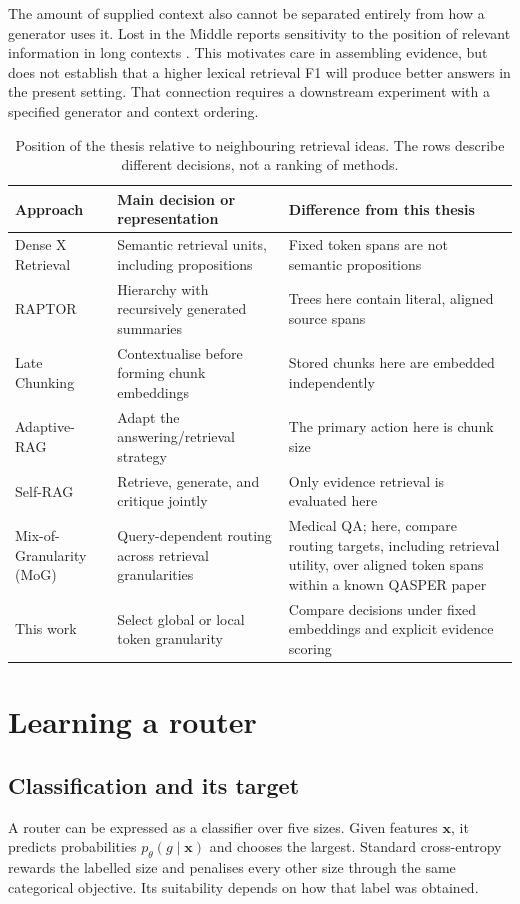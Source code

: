 The amount of supplied context also cannot be separated entirely from
how a generator uses it. Lost in the Middle reports sensitivity to the
position of relevant information in long contexts
\cite{liu2023lost}. This motivates care in assembling evidence, but
does not establish that a higher lexical retrieval F1 will produce
better answers in the present setting. That connection requires a
downstream experiment with a specified generator and context ordering.

\begin{table}[tbp]
\centering\small
\caption{Position of the thesis relative to neighbouring retrieval ideas.
The rows describe different decisions, not a ranking of methods.}
\label{tab:literature}
\begin{tabularx}{\textwidth}{@{}p{3.1cm}XX@{}}
\toprule
Approach & Main decision or representation & Difference from this thesis\\
\midrule
Dense X Retrieval & Semantic retrieval units, including propositions & Fixed token spans are not semantic propositions\\
RAPTOR & Hierarchy with recursively generated summaries & Trees here contain literal, aligned source spans\\
Late Chunking & Contextualise before forming chunk embeddings & Stored chunks here are embedded independently\\
Adaptive-RAG & Adapt the answering/retrieval strategy & The primary action here is chunk size\\
Self-RAG & Retrieve, generate, and critique jointly & Only evidence retrieval is evaluated here\\
Mix-of-Granularity (MoG) & Query-dependent routing across retrieval granularities & Medical QA; here, compare routing targets, including retrieval utility, over aligned token spans within a known QASPER paper\\
This work & Select global or local token granularity & Compare decisions under fixed embeddings and explicit evidence scoring\\
\bottomrule
\end{tabularx}
\end{table}

\section{Learning a router}
\subsection{Classification and its target}
A router can be expressed as a classifier over five sizes. Given features
$\mathbf{x}$, it predicts probabilities $p_\theta(g\mid\mathbf{x})$ and
chooses the largest. Standard cross-entropy rewards the labelled size
and penalises every other size through the same categorical objective.
Its suitability depends on how that label was obtained.

